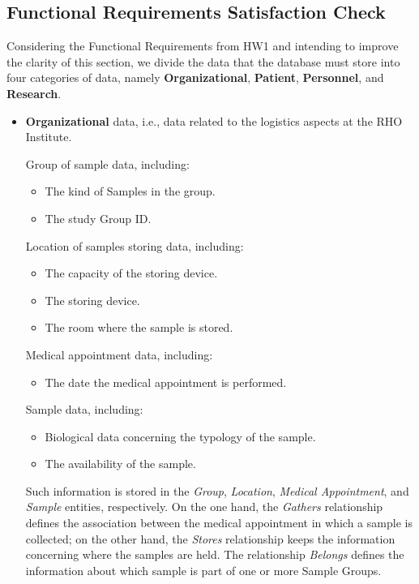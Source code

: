\subsection{Functional Requirements Satisfaction Check}
Considering the Functional Requirements from HW1 and intending to improve the clarity of this section, we divide the data that the database must store into four categories of data, namely \textbf{Organizational}, \textbf{Patient}, \textbf{Personnel}, and \textbf{Research}.
\begin{itemize} 

    \item \textbf{Organizational} data, i.e., data related to the logistics aspects at the RHO Institute.

    Group of sample data, including:
    \begin{itemize}
        \item The kind of Samples in the group.
        \item The study Group ID.
    \end{itemize}
    Location of samples storing data, including:
    \begin{itemize}
        \item The capacity of the storing device.
        \item The storing device.
        \item The room where the sample is stored.
    \end{itemize}
    Medical appointment data, including:
    \begin{itemize}
        \item The date the medical appointment is performed.
    \end{itemize}
    Sample data, including:
    \begin{itemize}
        \item Biological data concerning the typology of the sample.
        \item The availability of the sample.
    \end{itemize}   
    Such information is stored in the \emph{Group}, \emph{Location}, \emph{Medical Appointment}, and \emph{Sample} entities, respectively. On the one hand, the \emph{Gathers} relationship defines the association between the medical appointment in which a sample is collected; on the other hand, the \emph{Stores} relationship keeps the information concerning where the samples are held. The relationship \emph{Belongs} defines the information about which sample is part of one or more Sample Groups.


\end{itemize}
